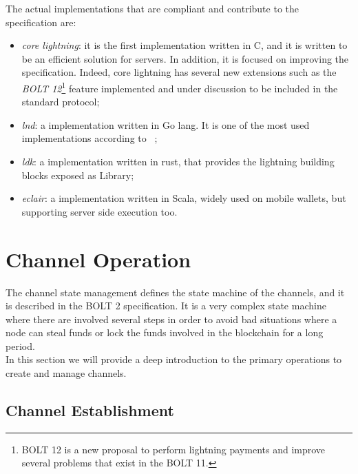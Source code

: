 The actual implementations that are compliant and contribute to the {\LN} specification are:

\begin{itemize}
  \item \emph{core lightning}: it is the first implementation written in C, and it is written
        to be an efficient solution for servers. In addition, it is focused on improving the {\LN} specification. Indeed, core lightning has several new extensions such as the \emph{BOLT 12}\footnote{BOLT 12 is a new proposal to perform
        lightning payments and improve several problems that exist in the BOLT 11.} feature implemented and under discussion to be
        included in the standard protocol;
    \item \emph{lnd}: a {\LN} implementation written in Go lang. It is one of the most used {\LN} implementations according to ~\cite{lngossip};
  \item \emph{ldk}: a {\LN} implementation written in rust, that provides the lightning building blocks exposed as Library;
  \item \emph{eclair}: a {\LN} implementation written in Scala, widely used on mobile wallets, but supporting server side execution too.
\end{itemize}

\section{{\LN} Channel Operation}
\label{sec:channel_state}

The channel state management defines the state machine of the channels, and it is described in the BOLT 2 specification. It is a very complex
state machine where there are involved several steps in order to avoid bad
situations where a node can steal funds or lock the funds involved in the blockchain for a long period.\\
In this section we will provide a deep introduction to the primary operations to create and manage channels.

\subsection{Channel Establishment}
\label{sec:open_a_channels}

